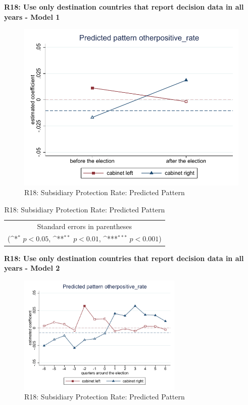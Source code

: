 \documentclass[10pt,a4paper]{scrartcl}
\begin{document}
\clearpage
\textbf{R18: Use only destination countries that report decision data in all years - Model 1}
\begin{figure}[!ht]
	\centering
	\includegraphics[width=1\textwidth]{figures_edited/otherpositive_rate_graph1_R18.pdf}
	\caption{R18: Subsidiary Protection Rate: Predicted Pattern}
\end{figure}

\begin{table}[!ht]\centering
	\renewcommand{\arraystretch}{1.25}
	\def\sym#1{\ifmmode^{#1}\else\(^{#1}\)\fi}
	\caption{R18: Subsidiary Protection Rate: Predicted Pattern}
	\begin{tabular}{l*{2}{c}}
		\hline\hline
		
		\hline\hline
		\multicolumn{3}{c}{\footnotesize Standard errors in parentheses} \\
		\multicolumn{3}{c}{\footnotesize (\sym{*} \(p<0.05\), \sym{**} \(p<0.01\), \sym{***} \(p<0.001\))}\\
	\end{tabular}
\end{table}

\clearpage
\textbf{R18: Use only destination countries that report decision data in all years - Model 2}
\begin{figure}[!ht]
	\centering
	\includegraphics[width=0.7\textwidth]{figures_edited/otherpositive_rate_graph2_R18.pdf}
	\caption{R18: Subsidiary Protection Rate: Predicted Pattern}
\end{figure}
\end{document}
